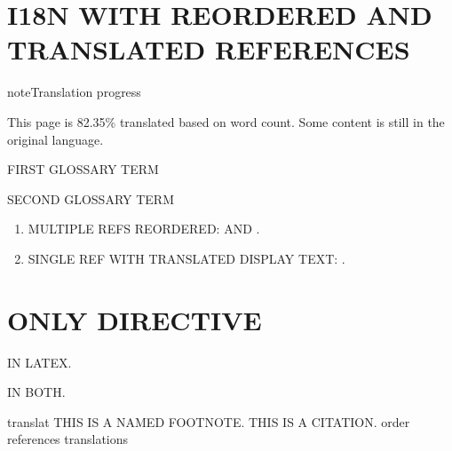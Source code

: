 \documentclass[letterpaper,10pt,english]{sphinxmanual}
\begin{document}
\sphinxstepscope


\chapter{I18N WITH REORDERED AND TRANSLATED REFERENCES}
\label{\detokenize{refs_reordered:i18n-with-reordered-and-translated-references}}\label{\detokenize{refs_reordered::doc}}
\begin{sphinxadmonition}{note}{Translation progress}

\sphinxAtStartPar
This page is 82.35\% translated based on word count. Some content is still in the original language.
\end{sphinxadmonition}
\begin{description}
\sphinxAtStartPar
FIRST GLOSSARY TERM

\sphinxAtStartPar
SECOND GLOSSARY TERM

\end{description}
\begin{enumerate}
%
\item {} 
\sphinxAtStartPar
MULTIPLE REFS REORDERED: {\hyperref[\detokenize{refs_reordered:term-term-two}]{}} AND {\hyperref[\detokenize{refs_reordered:term-term-one}]{}}.

\item {} 
\sphinxAtStartPar
SINGLE REF WITH TRANSLATED DISPLAY TEXT: {\hyperref[\detokenize{refs_reordered:term-term-one}]{}}.

\end{enumerate}

\sphinxstepscope


\chapter{ONLY DIRECTIVE}
\label{\detokenize{only:only-directive}}\label{\detokenize{only::doc}}
\sphinxAtStartPar
IN LATEX.

\sphinxAtStartPar
IN BOTH.

\begin{sphinxthebibliography}{translat}
\sphinxAtStartPar
THIS IS A NAMED FOOTNOTE.
\sphinxAtStartPar
THIS IS A CITATION.
\sphinxAtStartPar
order
\sphinxAtStartPar
references
\sphinxAtStartPar
translations
\end{sphinxthebibliography}



\renewcommand{\indexname}{Index}
\printindex
\end{document}
